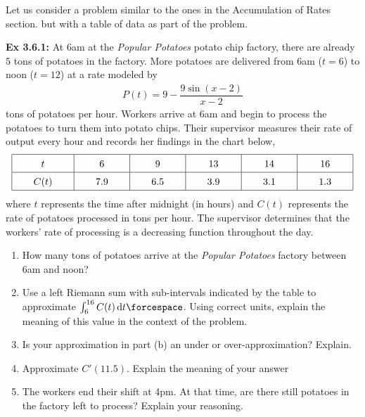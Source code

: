 Let us consider a problem similar to the ones in the Accumulation of Rates section. but with a table of data as part of the problem. \par

\begin{tcolorbox}[example]
    \textbf{Ex 3.6.1: } At 6am at the \textit{Popular Potatoes} potato chip factory, there are already $5$ tons of potatoes in the factory. More potatoes are delivered from 6am ($t = 6$) to noon ($t = 12$) at a rate modeled by \begin{align*}
        P(t) = 9 - \dfrac{9\sin(x - 2)}{x - 2}
    \end{align*}
    tons of potatoes per hour. Workers arrive at 6am and begin to process the potatoes to turn them into potato chips. Their supervisor measures their rate of output every hour and records her findings in the chart below, \begin{align*}
        \arraycolsep=22pt\def\arraystretch{1.5}
        \begin{array}{|c|c|c|c|c|c|}
            \hline
            t & 6 & 9 & 13 & 14 & 16 \\ \hline
            C(t) & 7.9 & 6.5 & 3.9 & 3.1 & 1.3 \\
            \hline
        \end{array}
    \end{align*}
    where $t$ represents the time after midnight (in hours) and $C(t)$ represents the rate of potatoes processed in tons per hour. The supervisor determines that the workers' rate of processing is a decreasing function throughout the day. \\
    \begin{enumerate}[label=\hspace{11pt}(\alph*), align=left, leftmargin=*, labelsep=0.25em]
        \item How many tons of potatoes arrive at the \textit{Popular Potatoes} factory between 6am and noon? \\
        \item Use a left Riemann sum with sub-intervals indicated by the table to approximate $\int_6^{16} C(t) \,\mathrm{d}t \forcespace$. Using correct units, explain the meaning of this value in the context of the problem. \\
        \item Is your approximation in part (b) an under or over-approximation? Explain. \\
        \item Approximate $C'(11.5)$. Explain the meaning of your answer \\
        \item The workers end their shift at 4pm. At that time, are there still potatoes in the factory left to process? Explain your reasoning.
    \end{enumerate}
\end{tcolorbox}
